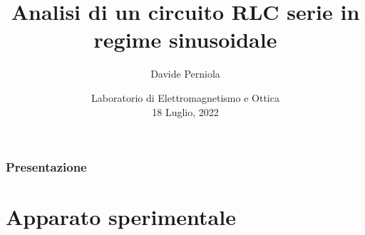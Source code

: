 \documentclass[
	11pt, %
]{beamer}
\title[RLC sinusoidale]{Analisi di un circuito RLC serie in regime sinusoidale} %
\subtitle{} %
\author[Davide Perniola]{Davide Perniola} %
\date[18 Luglio, 2022]{Laboratorio di Elettromagnetismo e Ottica \\ 18 Luglio, 2022} %
\begin{document}

\begin{frame}
	\titlepage %
\end{frame}



\begin{frame}
	\centering
	\frametitle{Presentazione} %
	
	\tableofcontents %
\end{frame}


\section{Apparato sperimentale} %
	
\end{document}
